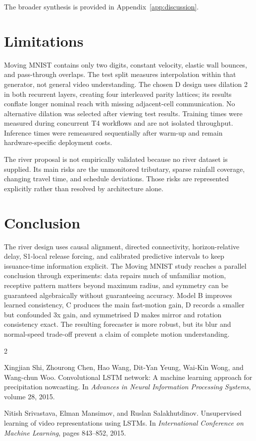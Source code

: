 \documentclass{article}
\begin{document}
The broader synthesis is provided in Appendix~\ref{app:discussion}.

\section{Limitations}

Moving MNIST contains only two digits, constant velocity, elastic wall bounces, and pass-through overlaps. The test split measures interpolation within that generator, not general video understanding. The chosen D design uses dilation 2 in both recurrent layers, creating four interleaved parity lattices; its results conflate longer nominal reach with missing adjacent-cell communication. No alternative dilation was selected after viewing test results. Training times were measured during concurrent T4 workflows and are not isolated throughput. Inference times were remeasured sequentially after warm-up and remain hardware-specific deployment costs.

The river proposal is not empirically validated because no river dataset is supplied. Its main risks are the unmonitored tributary, sparse rainfall coverage, changing travel time, and schedule deviations. Those risks are represented explicitly rather than resolved by architecture alone.

\section{Conclusion}

The river design uses causal alignment, directed connectivity, horizon-relative delay, S1-local release forcing, and calibrated predictive intervals to keep issuance-time information explicit. The Moving MNIST study reaches a parallel conclusion through experiments: data repairs much of unfamiliar motion, receptive pattern matters beyond maximum radius, and symmetry can be guaranteed algebraically without guaranteeing accuracy. Model B improves learned consistency, C produces the main fast-motion gain, D records a smaller but confounded 3x gain, and symmetrised D makes mirror and rotation consistency exact. The resulting forecaster is more robust, but its blur and normal-speed trade-off prevent a claim of complete motion understanding.

\begin{thebibliography}{2}

Xingjian Shi, Zhourong Chen, Hao Wang, Dit-Yan Yeung, Wai-Kin Wong, and Wang-chun Woo.
\newblock Convolutional LSTM network: A machine learning approach for precipitation nowcasting.
\newblock In \emph{Advances in Neural Information Processing Systems}, volume 28, 2015.

Nitish Srivastava, Elman Mansimov, and Ruslan Salakhutdinov.
\newblock Unsupervised learning of video representations using LSTMs.
\newblock In \emph{International Conference on Machine Learning}, pages 843--852, 2015.

\end{thebibliography}
\end{document}
